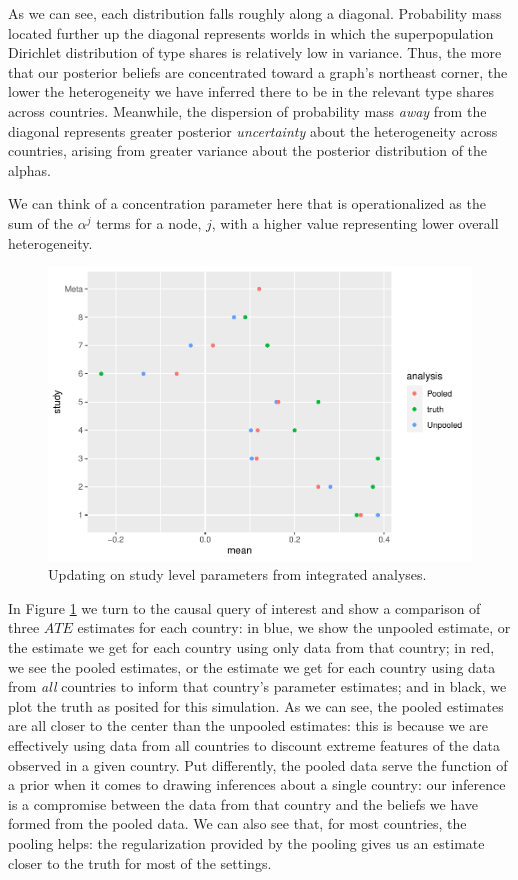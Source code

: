 \documentclass[
  12pt,
]{book}
\begin{document}
As we can see, each distribution falls roughly along a diagonal. Probability mass located further up the diagonal represents worlds in which the superpopulation Dirichlet distribution of type shares is relatively low in variance. Thus, the more that our posterior beliefs are concentrated toward a graph's northeast corner, the lower the heterogeneity we have inferred there to be in the relevant type shares across countries. Meanwhile, the dispersion of probability mass \emph{away} from the diagonal represents greater posterior \emph{uncertainty} about the heterogeneity across countries, arising from greater variance about the posterior distribution of the alphas.

We can think of a concentration parameter here that is operationalized as the sum of the \(\alpha^j\) terms for a node, \(j\), with a higher value representing lower overall heterogeneity.

\begin{figure}
\centering
\includegraphics{ii_files/figure-latex/metaplot-1.pdf}
\caption{\label{fig:metaplot}Updating on study level parameters from integrated analyses.}
\end{figure}

In Figure \ref{fig:metaplot} we turn to the causal query of interest and show a comparison of three \(ATE\) estimates for each country: in blue, we show the unpooled estimate, or the estimate we get for each country using only data from that country; in red, we see the pooled estimates, or the estimate we get for each country using data from \emph{all} countries to inform that country's parameter estimates; and in black, we plot the truth as posited for this simulation. As we can see, the pooled estimates are all closer to the center than the unpooled estimates: this is because we are effectively using data from all countries to discount extreme features of the data observed in a given country. Put differently, the pooled data serve the function of a prior when it comes to drawing inferences about a single country: our inference is a compromise between the data from that country and the beliefs we have formed from the pooled data. We can also see that, for most countries, the pooling helps: the regularization provided by the pooling gives us an estimate closer to the truth for most of the settings.
\end{document}
